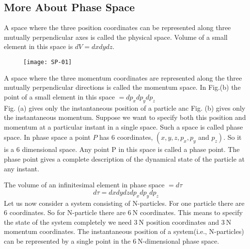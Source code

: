 \subsection{More About Phase Space}
 A space where the three position coordinates can be represented along three mutually perpendicular axes is called the physical space. Volume of a small element in this space is $d V=d x d y d z$.
\begin{figure}[H]
	\centering
	\texttt{[image: SP-01]}
\end{figure}
\par A space where the three momentum coordinates are represented along the three mutually perpendicular directions is called the momentum space. In Fig.(b) the point of a small element in this space $=d p_{x} d p_{y} d p_{z}$\\
 Fig. (a) gives only the instantaneous position of a particle anc Fig. (b) gives only the instantaneous momentum. Suppose we want to specify both this position and momentum at a particular instant in a single space. Such a space is called phase space. In phase space a point $P$ has 6 coordinates, $\left(x, y, z, p_{x}, p_{y}\right.$ and $\left.p_{z}\right)$. So it is a 6 dimensional space. Any point $\mathrm{P}$ in this space is called a phase point. The phase point gives a complete description of the dynamical state of the particle at any instant.\\
\par The volume of an infinitesimal element in phase space $=d \tau$
$$
d \tau=d x d y d z d p_{x} d p_{y} d p_{z}
$$
Let us now consider a system consisting of N-particles. For one particle there are 6 coordinates. So for N-particle there are $6 \mathrm{~N}$ coordinates. This means to specify the state of the system completely we need $3 \mathrm{~N}$ position coordinates and $3 \mathrm{~N}$ momentum coordinates. The instantaneous position of a system(i.e., N-particles) can be represented by a single point in the $6 \mathrm{~N}$-dimensional phase space.

